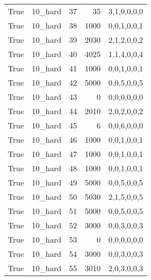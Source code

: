 \begin{tabular}{llrrl}
 True            & 10\_hard             &            37 &                    35 & 3,1,0,0,0,0   \\
 True            & 10\_hard             &            38 &                  1000 & 0,0,1,0,0,1   \\
 True            & 10\_hard             &            39 &                  2030 & 2,1,2,0,0,2   \\
 True            & 10\_hard             &            40 &                  4025 & 1,1,4,0,0,4   \\
 True            & 10\_hard             &            41 &                  1000 & 0,0,1,0,0,1   \\
 True            & 10\_hard             &            42 &                  5000 & 0,0,5,0,0,5   \\
 True            & 10\_hard             &            43 &                     0 & 0,0,0,0,0,0   \\
 True            & 10\_hard             &            44 &                  2010 & 2,0,2,0,0,2   \\
 True            & 10\_hard             &            45 &                     6 & 0,0,6,0,0,0   \\
 True            & 10\_hard             &            46 &                  1000 & 0,0,1,0,0,1   \\
 True            & 10\_hard             &            47 &                  1000 & 0,0,1,0,0,1   \\
 True            & 10\_hard             &            48 &                  1000 & 0,0,1,0,0,1   \\
 True            & 10\_hard             &            49 &                  5000 & 0,0,5,0,0,5   \\
 True            & 10\_hard             &            50 &                  5030 & 2,1,5,0,0,5   \\
 True            & 10\_hard             &            51 &                  5000 & 0,0,5,0,0,5   \\
 True            & 10\_hard             &            52 &                  3000 & 0,0,3,0,0,3   \\
 True            & 10\_hard             &            53 &                     0 & 0,0,0,0,0,0   \\
 True            & 10\_hard             &            54 &                  3000 & 0,0,3,0,0,3   \\
 True            & 10\_hard             &            55 &                  3010 & 2,0,3,0,0,3   \\

\end{tabular}
